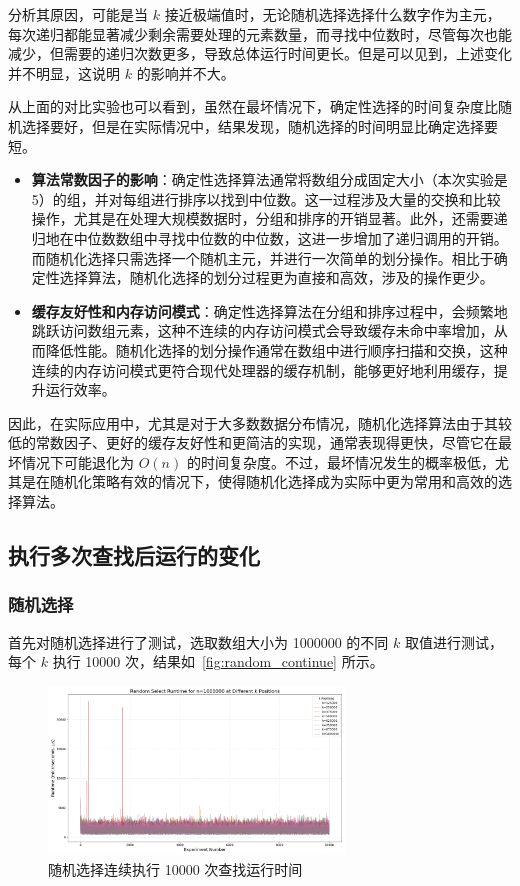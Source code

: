 分析其原因，可能是当 $k$ 接近极端值时，无论随机选择选择什么数字作为主元，每次递归都能显著减少剩余需要处理的元素数量，而寻找中位数时，尽管每次也能减少，但需要的递归次数更多，导致总体运行时间更长。但是可以见到，上述变化并不明显，这说明 $k$ 的影响并不大。

从上面的对比实验也可以看到，虽然在最坏情况下，确定性选择的时间复杂度比随机选择要好，但是在实际情况中，结果发现，随机选择的时间明显比确定选择要短。
\begin{itemize}
    \item \textbf{算法常数因子的影响}：确定性选择算法通常将数组分成固定大小（本次实验是5）的组，并对每组进行排序以找到中位数。这一过程涉及大量的交换和比较操作，尤其是在处理大规模数据时，分组和排序的开销显著。此外，还需要递归地在中位数数组中寻找中位数的中位数，这进一步增加了递归调用的开销。而随机化选择只需选择一个随机主元，并进行一次简单的划分操作。相比于确定性选择算法，随机化选择的划分过程更为直接和高效，涉及的操作更少。
    \item \textbf{缓存友好性和内存访问模式}：确定性选择算法在分组和排序过程中，会频繁地跳跃访问数组元素，这种不连续的内存访问模式会导致缓存未命中率增加，从而降低性能。随机化选择的划分操作通常在数组中进行顺序扫描和交换，这种连续的内存访问模式更符合现代处理器的缓存机制，能够更好地利用缓存，提升运行效率。
\end{itemize}
因此，在实际应用中，尤其是对于大多数数据分布情况，随机化选择算法由于其较低的常数因子、更好的缓存友好性和更简洁的实现，通常表现得更快，尽管它在最坏情况下可能退化为 $O(n)$ 的时间复杂度。不过，最坏情况发生的概率极低，尤其是在随机化策略有效的情况下，使得随机化选择成为实际中更为常用和高效的选择算法。

\subsection{执行多次查找后运行的变化}

\subsubsection{随机选择}

首先对随机选择进行了测试，选取数组大小为 1000000 的不同 $k$ 取值进行测试，每个 $k$ 执行 10000 次，结果如~\autoref{fig:random_continue} 所示。\begin{figure}[htbp]
    \centering
    \includegraphics[width=0.7\textwidth]{../figure/random_continue.png}
    \caption{随机选择连续执行 10000 次查找运行时间}
    \label{fig:random_continue}
\end{figure}

